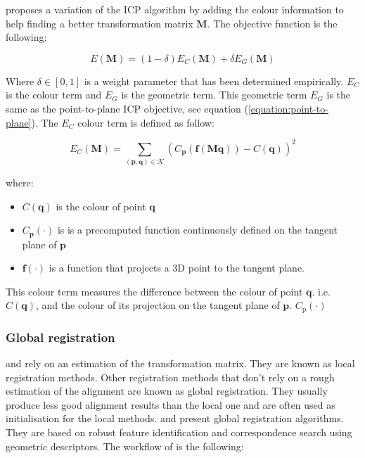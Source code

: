 \cite{park_colored_2017} proposes a variation of the ICP algorithm by adding the colour information to help finding a better transformation matrix $\mathbf{M}$. The objective function is the following:

\begin{equation}
\label{equation:coloured-ICP}
E(\mathbf{M})=(1-\delta) E_{C}(\mathbf{M})+\delta E_{G}(\mathbf{M})
\end{equation}

Where $\delta \in[0,1]$ is a weight parameter that has been determined empirically. $E_{C}$ is the colour term and $E_{G}$ is the geometric term. This geometric term $E_{G}$ is the same as the point-to-plane ICP objective, see equation (\ref{equation:point-to-plane}). The $E_{C}$ colour term is defined as follow:

\begin{equation}
E_{C}(\mathbf{M})=\sum_{(\mathbf{p}, \mathbf{q}) \in \mathcal{K}}\left(C_{\mathbf{p}}(\mathbf{f}(\mathbf{M} \mathbf{q}))-C(\mathbf{q})\right)^{2}
\end{equation}

where:

\begin{itemize}
    \item $C(\mathbf{q})$ is the colour of point $\mathbf{q}$
    \item $C_{\mathbf{p}}(\cdot)$ is is a precomputed function continuously defined on the tangent plane of $\mathbf{p}$
    \item $\mathbf{f}(\cdot)$ is a function that projects a 3D point to the tangent plane.
\end{itemize}

This colour term measures the difference between the colour of point $\mathbf{q}$. i.e. $C(\mathbf{q})$, and the colour of its projection on the tangent plane of $\mathbf{p}$. $C_{\mathrm{p}}(\cdot)$

\subsubsection{Global registration}
\label{section:Global registration}

 and  rely on an estimation of the transformation matrix. They are known as local registration methods. Other registration methods that don't rely on a rough estimation of the alignment are known as global registration. They usually produce less good alignment results than the local one and are often used as initialisation for the local methods. \cite{noauthor_global_nodate} and \cite{gelfand_robust_nodate} present global registration algorithms. They are based on robust feature identification and correspondence search using geometric descriptors. The workflow of \cite{noauthor_global_nodate} is the following:

